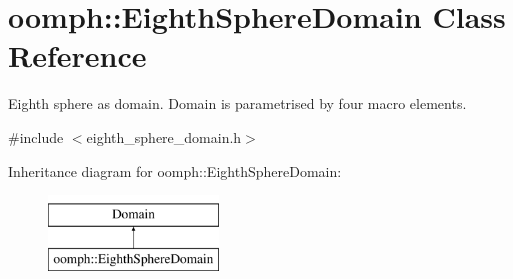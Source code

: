 \hypertarget{classoomph_1_1EighthSphereDomain}{}\section{oomph\+:\+:Eighth\+Sphere\+Domain Class Reference}
\label{classoomph_1_1EighthSphereDomain}


Eighth sphere as domain. Domain is parametrised by four macro elements.  




{\ttfamily \#include $<$eighth\+\_\+sphere\+\_\+domain.\+h$>$}

Inheritance diagram for oomph\+:\+:Eighth\+Sphere\+Domain\+:\begin{figure}[H]
\begin{center}
\leavevmode
\includegraphics[height=2.000000cm]{classoomph_1_1EighthSphereDomain}
\end{center}
\end{figure}
